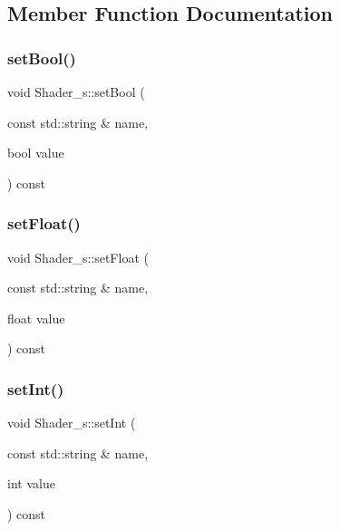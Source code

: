 \subsection{Member Function Documentation}
\mbox{\label{class_shader__s_a879f2669407bc55f15ec7cb7bdeb372c}} 
\subsubsection{\texorpdfstring{set\+Bool()}{setBool()}}
{\footnotesize\ttfamily void Shader\+\_\+s\+::set\+Bool (\begin{DoxyParamCaption}\item[{const std\+::string \&}]{name,  }\item[{bool}]{value }\end{DoxyParamCaption}) const\hspace{0.3cm}{\ttfamily [inline]}}

\mbox{\label{class_shader__s_ae20f4a11d558909ffb59584da4b5a534}} 
\subsubsection{\texorpdfstring{set\+Float()}{setFloat()}}
{\footnotesize\ttfamily void Shader\+\_\+s\+::set\+Float (\begin{DoxyParamCaption}\item[{const std\+::string \&}]{name,  }\item[{float}]{value }\end{DoxyParamCaption}) const\hspace{0.3cm}{\ttfamily [inline]}}

\mbox{\label{class_shader__s_a0fc37a704c203a98bbd82f101c0efd06}} 
\subsubsection{\texorpdfstring{set\+Int()}{setInt()}}
{\footnotesize\ttfamily void Shader\+\_\+s\+::set\+Int (\begin{DoxyParamCaption}\item[{const std\+::string \&}]{name,  }\item[{int}]{value }\end{DoxyParamCaption}) const\hspace{0.3cm}{\ttfamily [inline]}}

